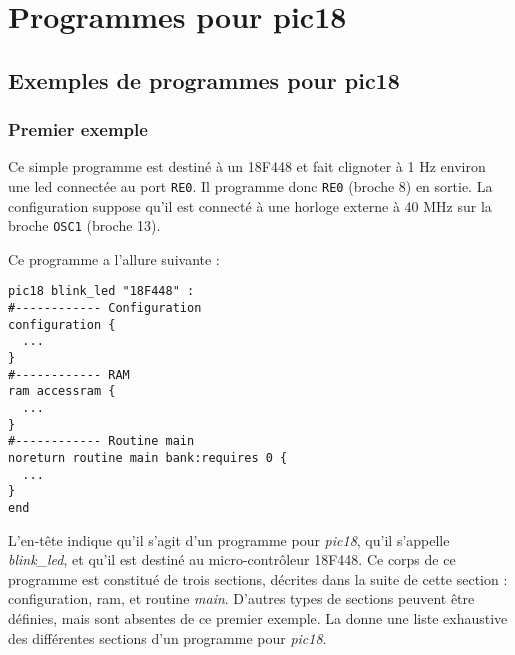 
\cleardoublepage

\chapter{Programmes pour pic18}

\thispagestyle{empty}




\section{Exemples de programmes pour pic18}

\subsection{Premier exemple}

Ce simple programme est destiné à un 18F448 et fait clignoter à 1 Hz environ une led connectée au port \texttt{RE0}. Il programme donc \texttt{RE0} (broche 8) en sortie. La configuration suppose qu'il est connecté à une horloge externe à 40 MHz sur la broche \texttt{OSC1} (broche 13). 

Ce programme a l'allure suivante :
\begin{lstlisting}[language=piccolo]
pic18 blink_led "18F448" :
#------------ Configuration
configuration {
  ...
}
#------------ RAM
ram accessram {
  ...
}
#------------ Routine main
noreturn routine main bank:requires 0 {
  ...
}
end
\end{lstlisting}

L'en-tête indique qu'il s'agit d'un programme pour \emph{pic18}, qu'il s'appelle \emph{blink\_led}, et qu'il est destiné au micro-contrôleur 18F448. Ce corps de ce programme est constitué de trois sections, décrites dans la suite de cette section : configuration, ram, et routine \emph{main}. D'autres types de sections peuvent être définies, mais sont absentes de ce premier exemple. La  donne une liste exhaustive des différentes sections d'un programme pour \emph{pic18}. 

